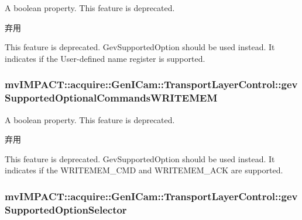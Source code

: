 A boolean property. This feature is deprecated. 

\begin{DoxyRefDesc}{弃用}
\item[\hyperlink{deprecated__deprecated000070}{弃用}]This feature is deprecated. Gev\+Supported\+Option should be used instead. It indicates if the User-\/defined name register is supported. \end{DoxyRefDesc}
\hypertarget{classmv_i_m_p_a_c_t_1_1acquire_1_1_gen_i_cam_1_1_transport_layer_control_a07c5096c618fdce89f909b513d93dd30}{
\subsubsection[{gev\+Supported\+Optional\+Commands\+W\+R\+I\+T\+E\+M\+E\+M}]{ mv\+I\+M\+P\+A\+C\+T\+::acquire\+::\+Gen\+I\+Cam\+::\+Transport\+Layer\+Control\+::gev\+Supported\+Optional\+Commands\+W\+R\+I\+T\+E\+M\+E\+M}}\label{classmv_i_m_p_a_c_t_1_1acquire_1_1_gen_i_cam_1_1_transport_layer_control_a07c5096c618fdce89f909b513d93dd30}


A boolean property. This feature is deprecated. 

\begin{DoxyRefDesc}{弃用}
\item[\hyperlink{deprecated__deprecated000075}{弃用}]This feature is deprecated. Gev\+Supported\+Option should be used instead. It indicates if the W\+R\+I\+T\+E\+M\+E\+M\+\_\+\+C\+M\+D and W\+R\+I\+T\+E\+M\+E\+M\+\_\+\+A\+C\+K are supported. \end{DoxyRefDesc}
\hypertarget{classmv_i_m_p_a_c_t_1_1acquire_1_1_gen_i_cam_1_1_transport_layer_control_aed28fb96d13bd5c11c8a15641d41559e}{
\subsubsection[{gev\+Supported\+Option\+Selector}]{ mv\+I\+M\+P\+A\+C\+T\+::acquire\+::\+Gen\+I\+Cam\+::\+Transport\+Layer\+Control\+::gev\+Supported\+Option\+Selector}}\label{classmv_i_m_p_a_c_t_1_1acquire_1_1_gen_i_cam_1_1_transport_layer_control_aed28fb96d13bd5c11c8a15641d41559e}


